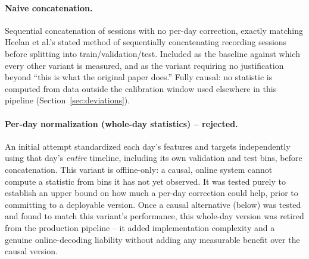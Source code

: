 
\paragraph{Naive concatenation.} Sequential concatenation of sessions with no
per-day correction, exactly matching Heelan et al.'s stated method of
sequentially concatenating recording sessions before splitting into
train/validation/test. Included as the baseline against which every other
variant is measured, and as the variant requiring no justification beyond
``this is what the original paper does.'' Fully causal: no statistic is
computed from data outside the calibration window used elsewhere in this
pipeline (Section~\ref{sec:deviations}).

\paragraph{Per-day normalization (whole-day statistics) -- rejected.} An
initial attempt standardized each day's features and targets independently
using that day's \emph{entire} timeline, including its own validation and
test bins, before concatenation. This variant is offline-only: a causal,
online system cannot compute a statistic from bins it has not yet observed.
It was tested purely to establish an upper bound on how much a per-day
correction could help, prior to committing to a deployable version. Once a
causal alternative (below) was tested and found to match this variant's
performance, this whole-day version was retired from the production
pipeline -- it added implementation complexity and a genuine online-decoding
liability without adding any measurable benefit over the causal version.

